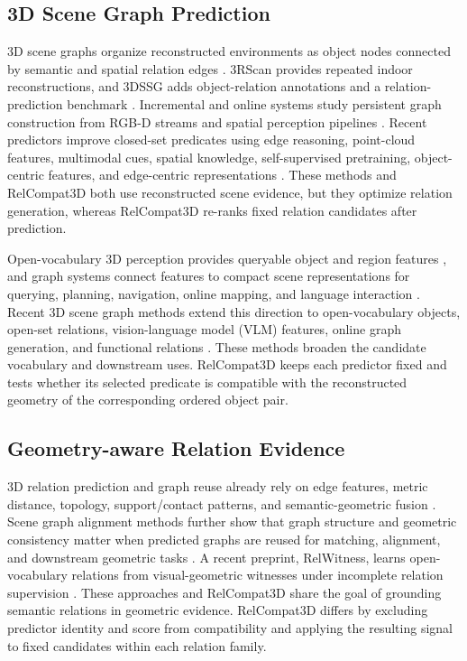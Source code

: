 \subsection{3D Scene Graph Prediction}
3D scene graphs organize reconstructed environments as object nodes connected by semantic and spatial relation edges \cite{armeni20193d}.
3RScan provides repeated indoor reconstructions, and 3DSSG adds object-relation annotations and a relation-prediction benchmark \cite{wald2019rio,wald2020learning}. Incremental and online systems study persistent graph construction from RGB-D streams and spatial perception pipelines \cite{wu2021scenegraphfusion,hughes2022hydra}. Recent predictors improve closed-set predicates using edge reasoning, point-cloud features, multimodal cues, spatial knowledge, self-supervised pretraining, object-centric features, and edge-centric representations \cite{zhang2021exploiting,feng20233d,wang2023vl,koch2024sgrec3d,heo2026object,ma2026edge}. These methods and RelCompat3D both use reconstructed scene evidence, but they optimize relation generation, whereas RelCompat3D re-ranks fixed relation candidates after prediction.

Open-vocabulary 3D perception provides queryable object and region features \cite{peng2023openscene,takmaz2023openmask3d}, and graph systems connect features to compact scene representations for querying, planning, navigation, online mapping, and language interaction \cite{gu2024conceptgraphs,werby2024hierarchical,maggio2024clio}. Recent 3D scene graph methods extend this direction to open-vocabulary objects, open-set relations, vision-language model (VLM) features, online graph generation, and functional relations \cite{koch2024open3dsg,chen2024clip,hou2025fross,zhang2025open,wang2025open}. These methods broaden the candidate vocabulary and downstream uses. RelCompat3D keeps each predictor fixed and tests whether its selected predicate is compatible with the reconstructed geometry of the corresponding ordered object pair. 

\subsection{Geometry-aware Relation Evidence}
3D relation prediction and graph reuse already rely on edge features, metric distance, topology, support/contact patterns, and semantic-geometric fusion \cite{zhang2021exploiting,feng20233d,xie2024sg,huang2025fireplace,shao2025great,sarkar2023sgaligner}. Scene graph alignment methods further show that graph structure and geometric consistency matter when predicted graphs are reused for matching, alignment, and downstream geometric tasks \cite{sarkar2023sgaligner, xie2024sg}. A recent preprint, RelWitness, learns open-vocabulary relations from visual-geometric witnesses under incomplete relation supervision \cite{nguyen2026relwitness}. These approaches and RelCompat3D share the goal of grounding semantic relations in geometric evidence. RelCompat3D differs by excluding predictor identity and score from compatibility and applying the resulting signal to fixed candidates within each relation family. 

